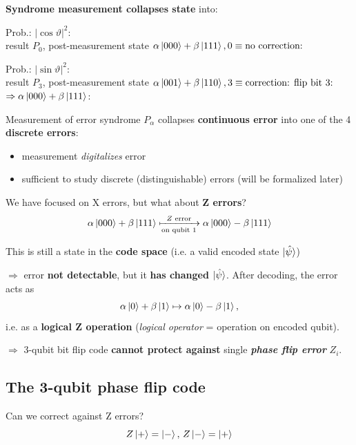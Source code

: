 \documentclass[a4paper, 12pt]{article}
\theoremstyle{plain}
\theoremstyle{definition}
\theoremstyle{remark}
\begin{document}
\textbf{Syndrome measurement collapses state} into:

Prob.: $|\cos\vartheta|^2$: \\result $P_0$, post-measurement state $\alpha\ket{000} + \beta\ket{111}, 0 \equiv \text{no correction:}$ \checkmark

Prob.: $|\sin\vartheta|^2$: \\result $P_3$, post-measurement state $\alpha\ket{001} + \beta\ket{110}, 3 \equiv \text{correction: flip bit 3:}$
$\Rightarrow \alpha \ket{000} + \beta \ket{111}$: \checkmark

Measurement of error syndrome ${P_\alpha}$ collapses \textbf{continuous error} into one of the 4 \textbf{discrete errors}:
\begin{itemize}
  \item measurement \emph{digitalizes} error
  \item sufficient to study discrete (distinguishable) errors (will be formalized later)
\end{itemize}

We have focused on X errors, but what about \textbf{Z errors}?
\begin{equation*}
  \alpha \ket{000} + \beta \ket{111} \xmapsto[\text{on qubit 1}]{Z \text{ error}} \alpha \ket{000} - \beta \ket{111}
\end{equation*}

This is still a state in the \textbf{code space} (i.e. a valid encoded state $\ket{\hat{\psi}}$)

$\Longrightarrow$ error \textbf{not detectable}, but it \textbf{has changed} $\ket{\hat{\psi}}$. After decoding, the error acts as
\begin{equation*}
  \alpha \ket{0} + \beta \ket{1} \mapsto \alpha \ket{0} - \beta \ket{1},
\end{equation*}
i.e. as a \textbf{logical Z operation} (\emph{logical operator} = operation on encoded qubit).

$\Longrightarrow$ 3-qubit bit flip code \textbf{cannot protect against} single \emph{\textbf{phase flip error}} $Z_i$.

\subsection{The 3-qubit phase flip code}

Can we correct against Z errors?
\begin{equation*}
  Z \ket{+} = \ket{-},\, Z \ket{-} = \ket{+}
\end{equation*}
\end{document}
